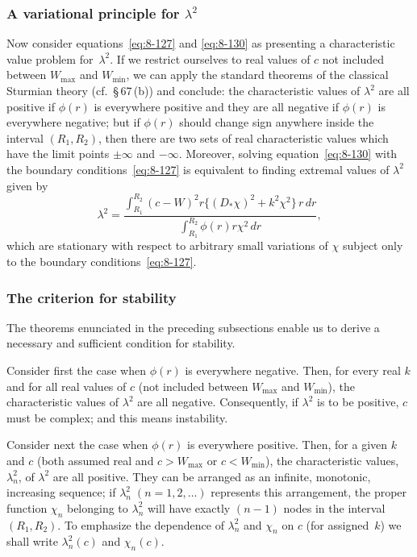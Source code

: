 \subsubsection{A variational principle for $\lambda^2$}
\label{sec:78b-ii}

Now consider equations~\eqref{eq:8-127} and \eqref{eq:8-130} as presenting a characteristic value problem for~$\lambda^2$. If we restrict ourselves to real values of $c$ not included between $W_{\max}$ and $W_{\min}$, we can apply the standard theorems of the classical Sturmian theory (cf.\ \S\,67\,(b)) and conclude: the characteristic values of $\lambda^2$ are all positive if $\phi(r)$ is everywhere positive and they are all negative if $\phi(r)$ is everywhere negative; but if $\phi(r)$ should change sign anywhere inside the interval $(R_1, R_2)$, then there are two sets of real characteristic values which have the limit points $\pm\infty$ and $-\infty$. Moreover, solving equation~\eqref{eq:8-130} with the boundary conditions~\eqref{eq:8-127} is equivalent to finding extremal values of $\lambda^2$ given by
\begin{equation}
\label{eq:8-139}
\lambda^2 = \frac{\displaystyle\int_{R_1}^{R_2}(c-W)^2r\bigl\{(D_*\chi)^2 + k^2\chi^2\bigr\}\,r\,dr}{\displaystyle\int_{R_1}^{R_2}\phi(r)r\chi^2\,dr},
\end{equation}
which are stationary with respect to arbitrary small variations of $\chi$ subject only to the boundary conditions~\eqref{eq:8-127}.

\subsubsection{The criterion for stability}
\label{sec:78b-iii}

The theorems enunciated in the preceding subsections enable us to derive a necessary and sufficient condition for stability.

Consider first the case when $\phi(r)$ is everywhere negative. Then, for every real $k$ and for all real values of $c$ (not included between $W_{\max}$ and $W_{\min}$), the characteristic values of $\lambda^2$ are all negative. Consequently, if $\lambda^2$ is to be positive, $c$ must be complex; and this means instability.

Consider next the case when $\phi(r)$ is everywhere positive. Then, for a given $k$ and $c$ (both assumed real and $c > W_{\max}$ or $c < W_{\min}$), the characteristic values, $\lambda_n^2$, of $\lambda^2$ are all positive. They can be arranged as an infinite, monotonic, increasing sequence; if $\lambda_n^2\;(n=1,2,\ldots)$ represents this arrangement, the proper function $\chi_n$ belonging to $\lambda_n^2$ will have exactly $(n-1)$ nodes in the interval $(R_1, R_2)$. To emphasize the dependence of $\lambda_n^2$ and $\chi_n$ on $c$ (for assigned~$k$) we shall write $\lambda_n^2(c)$ and $\chi_n(c)$.

